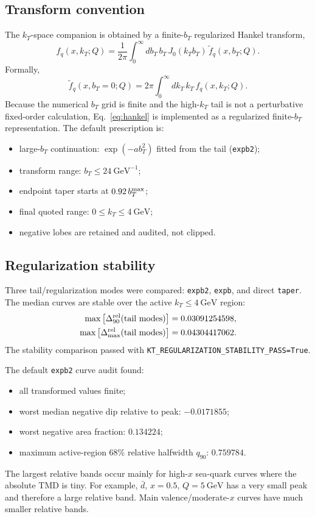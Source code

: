 \documentclass[11pt]{article}
\newcommand{\bt}{b_T}
\newcommand{\kt}{k_T}
\newcommand{\GeV}{\mathrm{GeV}}
\newcommand{\code}[1]{\texttt{#1}}
\begin{document}
\subsection{Transform convention}

The $\kt$-space companion is obtained by a finite-$\bt$ regularized Hankel transform,
\begin{equation}
\label{eq:hankel}
  f_q(x,\kt;Q)
  =
  \frac{1}{2\pi}\int_0^\infty d\bt\,\bt\,J_0(\kt\bt)\,
  \widetilde f_q(x,\bt;Q).
\end{equation}
Formally,
\begin{equation}
  \widetilde f_q(x,\bt=0;Q)
  =2\pi\int_0^\infty d\kt\,\kt\,f_q(x,\kt;Q).
\end{equation}
Because the numerical $\bt$ grid is finite and the high-$\kt$ tail is not a perturbative fixed-order calculation, Eq.~\eqref{eq:hankel} is implemented as a regularized finite-$\bt$ representation.  The default prescription is:
\begin{itemize}
  \item large-$\bt$ continuation: $\exp(-a\bt^2)$ fitted from the tail (\code{expb2});
  \item transform range: $\bt\le 24~\GeV^{-1}$;
  \item endpoint taper starts at $0.92\,\bt^{\rm max}$;
  \item final quoted range: $0\le\kt\le4~\GeV$;
  \item negative lobes are retained and audited, not clipped.
\end{itemize}

\subsection{Regularization stability}

Three tail/regularization modes were compared: \code{expb2}, \code{expb}, and direct \code{taper}.  The median curves are stable over the active $\kt\le4~\GeV$ region:
\begin{align}
  \max\left[\Delta_{90}^{\rm rel}(\text{tail modes})\right] &= 0.03091254598,\\
  \max\left[\Delta_{\max}^{\rm rel}(\text{tail modes})\right] &= 0.04304417062.
\end{align}
The stability comparison passed with \code{KT\_REGULARIZATION\_STABILITY\_PASS=True}.

The default \code{expb2} curve audit found:
\begin{itemize}
  \item all transformed values finite;
  \item worst median negative dip relative to peak: $-0.0171855$;
  \item worst negative area fraction: $0.134224$;
  \item maximum active-region 68\% relative halfwidth $q_{90}$: $0.759784$.
\end{itemize}
The largest relative bands occur mainly for high-$x$ sea-quark curves where the absolute TMD is tiny.  For example, $\bar d$, $x=0.5$, $Q=5~\GeV$ has a very small peak and therefore a large relative band.  Main valence/moderate-$x$ curves have much smaller relative bands.
\end{document}
